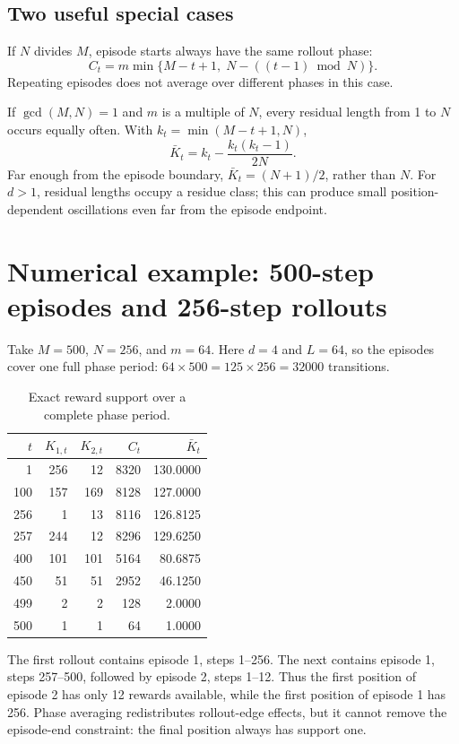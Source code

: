 \documentclass[11pt,a4paper]{article}
\numberwithin{equation}{section}
\begin{document}
\subsection{Two useful special cases}
If $N$ divides $M$, episode starts always have the same rollout phase:
\begin{equation}
 C_t=m\min\{M-t+1,\;N-((t-1)\bmod N)\}.
\end{equation}
Repeating episodes does not average over different phases in this case.

If $\gcd(M,N)=1$ and $m$ is a multiple of $N$, every residual length from 1 to $N$
occurs equally often. With $k_t=\min(M-t+1,N)$,
\begin{equation}
 \boxed{\bar K_t=k_t-\frac{k_t(k_t-1)}{2N}.}
\end{equation}
Far enough from the episode boundary, $\bar K_t=(N+1)/2$, rather than $N$.
For $d>1$, residual lengths occupy a residue class; this can produce small
position-dependent oscillations even far from the episode endpoint.

\section{Numerical example: 500-step episodes and 256-step rollouts}
Take $M=500$, $N=256$, and $m=64$. Here $d=4$ and $L=64$, so the episodes cover
one full phase period: $64\times500=125\times256=32000$ transitions.

\begin{table}[htbp]\centering
\caption{Exact reward support over a complete phase period.}
\begin{tabular}{rrrrr}\toprule
$t$ & $K_{1,t}$ & $K_{2,t}$ & $C_t$ & $\bar K_t$ \\\midrule
1 & 256 & 12 & 8320 & 130.0000 \\
100 & 157 & 169 & 8128 & 127.0000 \\
256 & 1 & 13 & 8116 & 126.8125 \\
257 & 244 & 12 & 8296 & 129.6250 \\
400 & 101 & 101 & 5164 & 80.6875 \\
450 & 51 & 51 & 2952 & 46.1250 \\
499 & 2 & 2 & 128 & 2.0000 \\
500 & 1 & 1 & 64 & 1.0000 \\\bottomrule
\end{tabular}
\end{table}

The first rollout contains episode 1, steps 1--256. The next contains episode 1,
steps 257--500, followed by episode 2, steps 1--12. Thus the first position of
episode 2 has only 12 rewards available, while the first position of episode 1
has 256. Phase averaging redistributes rollout-edge effects, but it cannot remove
the episode-end constraint: the final position always has support one.
\end{document}
